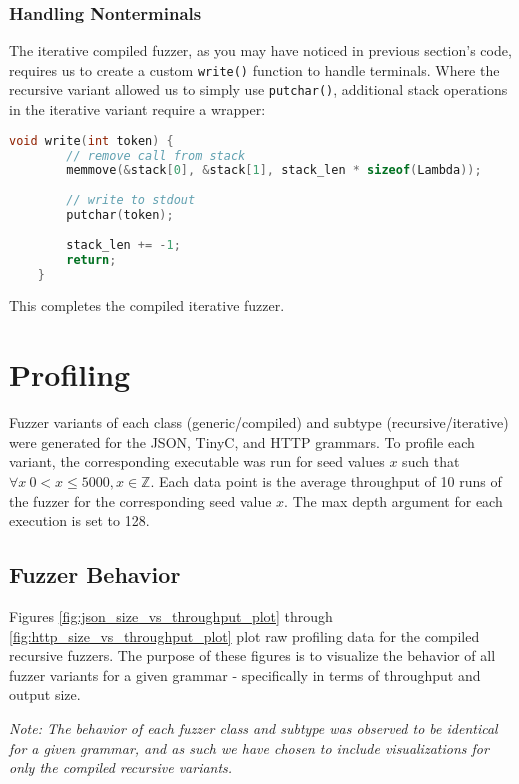 \documentclass[8pt, twoside]{extarticle}
\begin{document}
\subsubsection{Handling Nonterminals}

The iterative compiled fuzzer, as you may have noticed in previous section's code, requires us to create a custom \verb|write()| function to handle terminals. Where the recursive variant allowed us to simply use \verb|putchar()|, additional stack operations in the iterative variant require a wrapper:

\begin{lstlisting}[gobble=2, language=C, caption={Custom write function}]
	void write(int token) {
		// remove call from stack
		memmove(&stack[0], &stack[1], stack_len * sizeof(Lambda));
		
		// write to stdout
		putchar(token);
		
		stack_len += -1;
		return;
	}
\end{lstlisting}

This completes the compiled iterative fuzzer.

\section{Profiling} \label{sec:profiling}

Fuzzer variants of each class (generic/compiled) and subtype (recursive/iterative) were generated for the JSON, TinyC, and HTTP grammars. To profile each variant, the corresponding executable was run for seed values $x$ such that  $\forall x\ 0 < x \leq 5000, x \in \mathbb{Z}$. Each data point is the average throughput of 10 runs of the fuzzer for the corresponding seed value $x$. The max depth argument for each execution is set to 128.

\subsection{Fuzzer Behavior}

Figures \ref{fig:json_size_vs_throughput_plot} through \ref{fig:http_size_vs_throughput_plot} plot raw profiling data for the compiled recursive fuzzers. The purpose of these figures is to visualize the behavior of all fuzzer variants for a given grammar - specifically in terms of throughput and output size. 

\textit{Note: The behavior of each fuzzer class and subtype was observed to be identical for a given grammar, and as such we have chosen to include visualizations for only the compiled recursive variants.}
\end{document}
